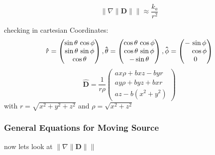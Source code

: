 \begin{equation}
	\Big\| \nabla \| \mathbf{D} \| \Big\| \approx  \frac{k_{a}}{r^2}
\end{equation}

checking in cartesian Coordinates:
\begin{equation}
	\mathbf{\hat{\text{${r}$}}} =
	\begin{pmatrix}
		\sin\theta \, \cos\phi \\
		\sin\theta \, \sin\phi \\
		\cos\theta            \\
	\end{pmatrix},
	\mathbf{\hat{\text{$\theta$}}} =
	\begin{pmatrix}
		\cos\theta \, \cos\phi \\
		\cos\theta \, \sin\phi \\
		-\sin\theta            \\
	\end{pmatrix},
	\mathbf{\hat{\text{$\phi$}}} =
	\begin{pmatrix}
		-\, \sin\phi             \\
		\hphantom{-} \, \cos\phi \\
		0                        \\
	\end{pmatrix}
\end{equation}
\begin{equation}
	\mathbf{\hat{\text{${D}$}}} = \frac{1}{r\rho}
	\begin{pmatrix}
		ax\rho +bxz - byr  \\
		ay\rho + byz + bxr \\
		az - b(x^2+y^2)
	\end{pmatrix}
\end{equation}
with $r=\sqrt{x^2+y^2+z^2}$ and $\rho=\sqrt{x^2+z^2}$

\subsubsection{General Equations for Moving Source}\label{subsubsect: General Equations for Moving Source 2}

now lets look at $\big\| \nabla \|\mathbf{D}\| \big\|$

